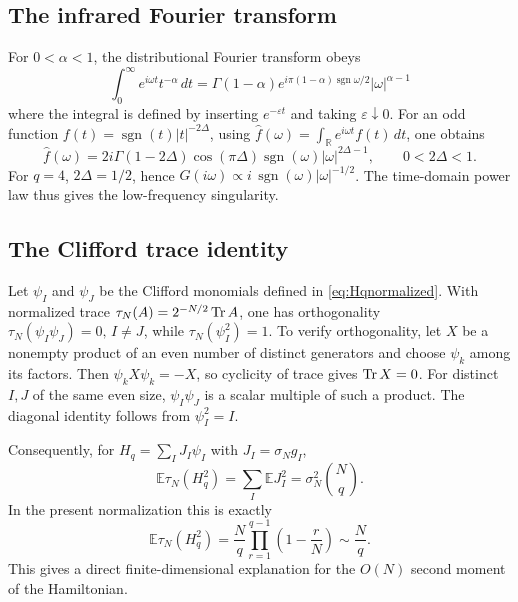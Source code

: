 \documentclass[11pt]{article}
\numberwithin{equation}{section}
\theoremstyle{exposition}
\theoremstyle{result}
\newcommand{\E}{\mathbb E}
\newcommand{\R}{\mathbb R}
\newcommand{\sgn}{\operatorname{sgn}}
\begin{document}
\subsection{The infrared Fourier transform}

For $0<\alpha<1$, the distributional Fourier transform obeys
\begin{equation*}
\int_0^\infty e^{i\omega t}t^{-\alpha}\,dt
=\Gamma(1-\alpha)e^{i\pi(1-\alpha)\sgn\omega/2}|\omega|^{\alpha-1}
\end{equation*}
where the integral is defined by inserting $e^{-\varepsilon t}$ and taking $\varepsilon\downarrow0$. For an odd function $f(t)=\sgn(t)|t|^{-2\Delta}$, using $\widehat f(\omega)=\int_\R e^{i\omega t}f(t)\,dt$, one obtains
\begin{equation*}
\widehat f(\omega)=2i\Gamma(1-2\Delta)\cos(\pi\Delta)
\sgn(\omega)|\omega|^{2\Delta-1},\qquad 0<2\Delta<1.
\end{equation*}
For $q=4$, $2\Delta=1/2$, hence $G(i\omega)\propto i\,\sgn(\omega)|\omega|^{-1/2}$. The time-domain power law thus gives the low-frequency singularity.

\subsection{The Clifford trace identity}

Let $\psi_I$ and $\psi_J$ be the Clifford monomials defined in \eqref{eq:Hqnormalized}. With normalized trace $\tau_N(A)=2^{-N/2}\Tr A$, one has orthogonality $\tau_N(\psi_I\psi_J)=0, \, I\ne J$, while $\tau_N(\psi_I^2)=1$. To verify orthogonality, let $X$ be a nonempty product of an even number of distinct generators and choose $\psi_k$ among its factors. Then $\psi_kX\psi_k=-X$, so cyclicity of trace gives $\Tr X=0$. For distinct $I,J$ of the same even size, $\psi_I\psi_J$ is a scalar multiple of such a product. The diagonal identity follows from $\psi_I^2=I$.

Consequently, for $H_q=\sum_IJ_I\psi_I$ with $J_I=\sigma_Ng_I$,
\begin{equation*}
\E\tau_N(H_q^2)
=\sum_I\E J_I^2
=\sigma_N^2\binom Nq.
\end{equation*}
In the present normalization this is exactly
\begin{equation*}
\E\tau_N(H_q^2)
=\frac Nq\prod_{r=1}^{q-1}\left(1-\frac rN\right)
\sim\frac Nq.
\end{equation*}
This gives a direct finite-dimensional explanation for the $O(N)$ second moment of the Hamiltonian.
\end{document}
